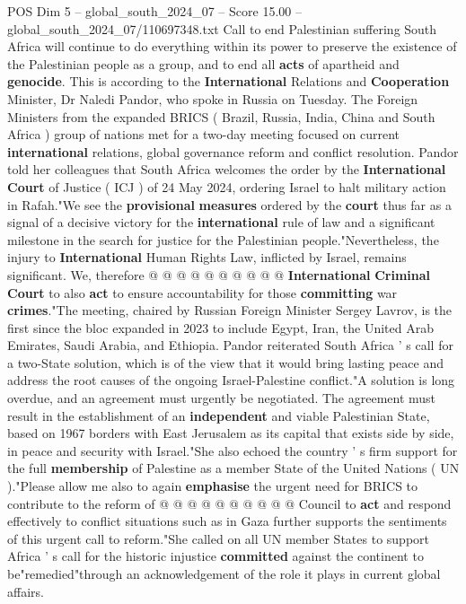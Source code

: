 \begin{textsample}{POS Dim 5 – global\_south\_2024\_07 – Score 15.00 – global\_south\_2024\_07/110697348.txt}  \label{ex:f5_pos_179}
Call to end Palestinian suffering South Africa will continue to do everything within its power to preserve the existence of the Palestinian people as a group, and to end all \textbf{acts} of apartheid and \textbf{genocide}.
This is according to the \textbf{International} Relations and \textbf{Cooperation} Minister, Dr Naledi Pandor, who spoke in Russia on Tuesday.
The Foreign Ministers from the expanded BRICS ( Brazil, Russia, India, China and South Africa ) group of nations met for a two-day meeting focused on current \textbf{international} relations, global governance reform and conflict resolution.
Pandor told her colleagues that South Africa welcomes the order by the \textbf{International} \textbf{Court} of Justice ( ICJ ) of 24 May 2024, ordering Israel to halt military action in Rafah."We see the \textbf{provisional} \textbf{measures} ordered by the \textbf{court} thus far as a signal of a decisive victory for the \textbf{international} rule of law and a significant milestone in the search for justice for the Palestinian people."Nevertheless, the injury to \textbf{International} Human Rights Law, inflicted by Israel, remains significant.
We, therefore @ @ @ @ @ @ @ @ @ @ \textbf{International} \textbf{Criminal} \textbf{Court} to also \textbf{act} to ensure accountability for those \textbf{committing} war \textbf{crimes}."The meeting, chaired by Russian Foreign Minister Sergey Lavrov, is the first since the bloc expanded in 2023 to include Egypt, Iran, the United Arab Emirates, Saudi Arabia, and Ethiopia.
Pandor reiterated South Africa ' s call for a two-State solution, which is of the view that it would bring lasting peace and address the root causes of the ongoing Israel-Palestine conflict."A solution is long overdue, and an agreement must urgently be negotiated.
The agreement must result in the establishment of an \textbf{independent} and viable Palestinian State, based on 1967 borders with East Jerusalem as its capital that exists side by side, in peace and security with Israel."She also echoed the country ' s firm support for the full \textbf{membership} of Palestine as a member State of the United Nations ( UN )."Please allow me also to again \textbf{emphasise} the urgent need for BRICS to contribute to the reform of @ @ @ @ @ @ @ @ @ @ Council to \textbf{act} and respond effectively to conflict situations such as in Gaza further supports the sentiments of this urgent call to reform."She called on all UN member States to support Africa ' s call for the historic injustice \textbf{committed} against the continent to be"remedied"through an acknowledgement of the role it plays in current global affairs.

\end{textsample}
